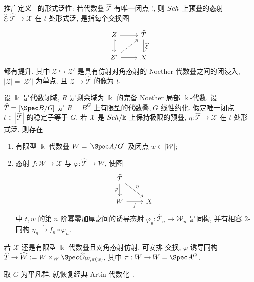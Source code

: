 推广定义~ 的形式泛性: 若代数叠 $\widehat{\mathcal T}$ 有唯一闭点 $t$, 则 $Sch$ 上预叠的态射 $\widehat\xi:\widehat{\mathcal T}\to\mathcal X$ 在 $t$ 处形式泛, 是指每个交换图
\begin{align*}
\begin{tikzcd}[ampersand replacement=\&]
\mathcal Z\arrow[r]\arrow[d,hook]\&\widehat{\mathcal T}\arrow[d,"{\widehat\xi}"]\\
\mathcal Z'\arrow[r]\arrow[ur,dashed]\&\mathcal X
\end{tikzcd}
\end{align*}
都有提升, 其中 $\mathcal Z\hookrightarrow\mathcal Z'$ 是具有仿射对角态射的 Noether 代数叠之间的闭浸入, $|\mathcal Z|=|\mathcal Z'|$ 为单点, 且 $\mathcal Z\to\widehat{\mathcal T}$ 的像为 $t$.
\begin{theorem}\label{src:7.7.18}
设 $\Bbbk$ 是代数闭域, $R$ 是剩余域为 $\Bbbk$ 的完备 Noether 局部 $\Bbbk$-代数. 设 $\widehat{\mathcal T}=[\Spec B/G]$ 是 $R=B^G$ 上有限型的代数叠, $G$ 线性约化. 假定唯一闭点 $t\in|\widehat{\mathcal T}|$ 的稳定子等于 $G$. 若 $\mathcal X$ 是 $Sch/\Bbbk$ 上保持极限的预叠, $\eta:\widehat{\mathcal T}\to\mathcal X$ 在 $t$ 处形式泛, 则存在
\begin{enumerate}[(1)]
\item 有限型 $\Bbbk$-代数叠 $\mathcal W=[\Spec A/G]$ 及闭点 $w\in|\mathcal W|$;
\item 态射 $f:\mathcal W\to\mathcal X$ 与 $\varphi:\widehat{\mathcal T}\to\mathcal W$, 使图
\begin{align}\label{src:7.7.19}
\begin{tikzcd}[ampersand replacement=\&]
\widehat{\mathcal T}\arrow[d,"{\varphi}"']\arrow[dr,"{\eta}"]\&\\
\mathcal W\arrow[r,"{f}"']\&\mathcal X
\end{tikzcd}
\end{align}
中 $t,w$ 的第 $n$ 阶幂零加厚之间的诱导态射 $\varphi_n:\widehat{\mathcal T}_n\to\mathcal W_n$ 是同构, 并有相容 $2$-同构 $\eta_n\xrightarrow{\sim}f_n\circ\varphi_n$.
\end{enumerate}
若 $\mathcal X$ 还是有限型 $\Bbbk$-代数叠且对角态射仿射, 可安排  交换, $\varphi$ 诱导同构 $\widehat{\mathcal T}\to\widehat{\mathcal W}:=\mathcal W\times_W\Spec\widehat{\mathcal O}_{W,\pi(w)}$, 其中 $\pi:\mathcal W\to W=\Spec A^G$.
\end{theorem}
\begin{remark}\label{src:7.7.20}
取 $G$ 为平凡群, 就恢复经典 Artin 代数化~.
\end{remark}
